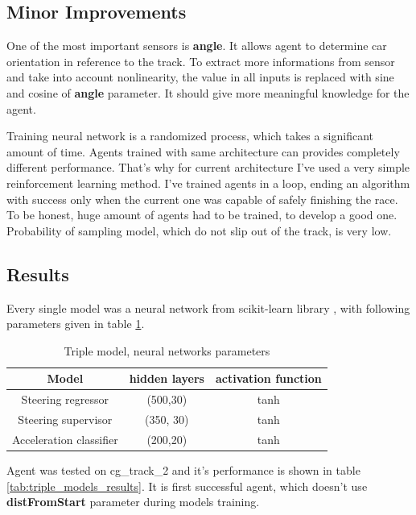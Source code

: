 \documentclass[declaration,shortabstract,english,inz]{iithesis}
\begin{document}
\subsection{Minor Improvements}
One of the most important sensors is \textbf{angle}.
It allows agent to determine car orientation in reference to the track.
To extract more informations from sensor and take into account nonlinearity, the value in all inputs is replaced with sine and cosine of \textbf{angle} parameter.
It should give more meaningful knowledge for the agent.



Training neural network is a randomized process, which takes a significant amount of time.
Agents trained with same architecture can provides completely different performance.
That's why for current architecture I've used a very simple reinforcement learning method.
I've trained agents in a loop, ending an algorithm with success only when the current one was capable of safely finishing the race.
To be honest, huge amount of agents had to be trained, to develop a good one.
Probability of sampling model, which do not slip out of the track, is very low.



\subsection{Results}



Every single model was a neural network from scikit-learn library \cite{scikit_learn}, with following parameters given in table \ref{tab:triple_models_nn_params}.

\begin{table}[h]
    \centering
    \begin{tabular}{ |c|c|c|}
          \hline
          Model & hidden layers & activation function \\
          \hline
          Steering regressor & (500,30) &  tanh  \\
          \hline
          Steering supervisor &  (350, 30) & tanh \\
          \hline
          Acceleration classifier & (200,20) & tanh \\
          \hline
        \end{tabular}
        \caption{Triple model, neural networks parameters}
        \label{tab:triple_models_nn_params}
\end{table}

Agent was tested on cg\_track\_2 and it's performance is shown in table \ref{tab:triple_models_results}.
It is first successful agent, which doesn't use \textbf{distFromStart} parameter during models training.
\end{document}
